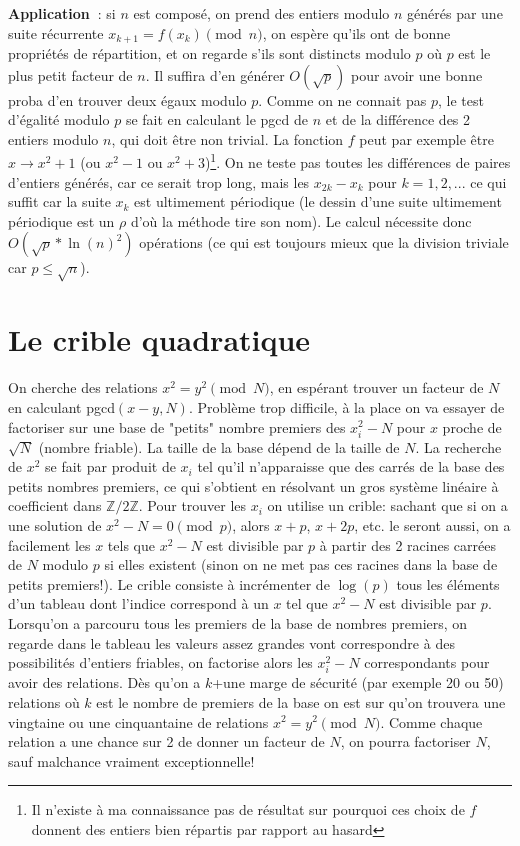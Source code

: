 \documentclass[a4paper,11pt]{book}
\begin{document}
\begin{giacjshere}
{\bf Application~}: si $n$ est composé, on prend des entiers modulo $n$
générés par une suite 
récurrente $x_{k+1}=f(x_k) \pmod n$, 
on espère qu'ils ont de bonne propriétés de répartition, 
et on regarde s'ils sont distincts modulo $p$ où $p$ est 
le plus petit facteur de $n$. Il suffira d'en générer 
$O(\sqrt{p})$ pour avoir une bonne proba d'en trouver 
deux égaux modulo $p$. 
Comme on ne connait pas $p$, le test d'égalité modulo $p$ 
se fait en calculant le pgcd de $n$ et
de la différence des 2 entiers modulo $n$,
qui doit être non trivial. 
La fonction $f$ peut par exemple être $x \rightarrow x^2+1$ 
(ou $x^2-1$ ou $x^2+3$)\footnote{Il n'existe \`a ma connaissance
pas de résultat sur pourquoi ces choix de $f$ donnent 
des entiers bien répartis par rapport au hasard}. 
On ne teste pas toutes les différences de paires d'entiers générés,
car ce serait trop long,
mais les $x_{2k}-x_k$ pour $k=1,2,...$ 
ce qui suffit car la suite $x_k$ est ultimement périodique 
(le dessin d'une suite ultimement p\'eriodique est un $\rho$
d'o\`u la m\'ethode tire son nom). 
Le calcul nécessite donc $O(\sqrt{p}*\ln(n)^2)$ opérations 
(ce qui est toujours mieux que la division triviale car $p \leq \sqrt{n}$).

\section{Le crible quadratique}
On cherche des relations $x^2=y^2 \pmod N$, en espérant trouver un
facteur de $N$  en calculant pgcd$(x-y,N)$.
Problème trop difficile, à la place on va essayer de factoriser sur
une base de "petits" nombre premiers des $x_i^2-N$ pour $x$ 
proche de $\sqrt{N}$ (nombre friable). 
La taille de la base dépend de la taille de $N$. 
La recherche de $x^2$ se fait par produit de $x_i$ 
tel qu'il n'apparaisse que des carrés de la base des petits 
nombres premiers, ce qui s'obtient en résolvant 
un gros système linéaire à coefficient dans $\mathbb{Z}/2\mathbb{Z}$.
Pour trouver les $x_i$ on utilise un crible: 
sachant que si on a une solution de $x^2-N=0 \pmod p$, 
alors $x+p$, $x+2p$, etc. le seront aussi, on a facilement les $x$ 
tels que $x^2-N$ est divisible par $p$ à partir des 2 racines carrées 
de $N$ modulo $p$ si elles existent 
(sinon on ne met pas ces racines dans la base de petits premiers!). 
Le crible consiste à incrémenter de $\log(p)$ 
tous les éléments d'un tableau dont l'indice correspond 
à un $x$ tel que $x^2-N$ est divisible par $p$. 
Lorsqu'on a parcouru tous les premiers de la base de nombres premiers, 
on regarde dans le tableau les valeurs assez grandes 
vont correspondre à des possibilités d'entiers friables, 
on factorise alors les $x_i^2-N$ correspondants pour avoir des relations. 
Dès qu'on a $k$+une marge de sécurité (par exemple 20 ou 50) 
relations où $k$ est le nombre de premiers de la base 
on est sur qu'on trouvera une vingtaine ou une cinquantaine de
relations 
$x^2=y^2 \pmod N$. 
Comme chaque relation a une chance sur 2 de donner un facteur de $N$, 
on pourra factoriser $N$, sauf malchance vraiment exceptionnelle!


\end{giacjshere}
\end{document}
